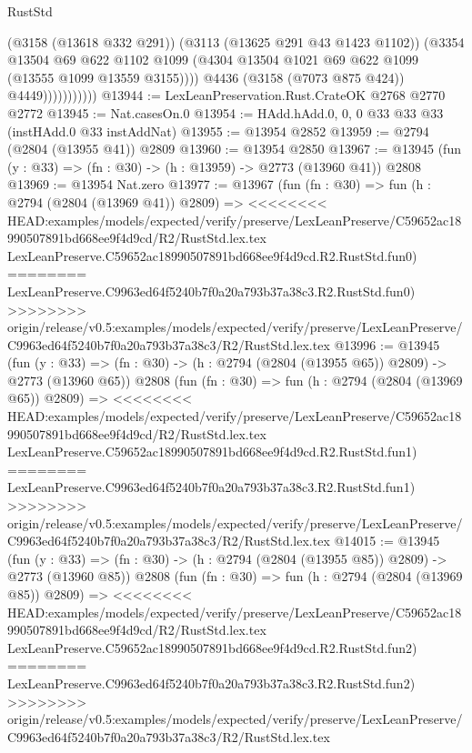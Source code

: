 \begin{lexlean}{RustStd}
\begin{coremodule}
{\begin{coremodule}
{{{{{{{{{{{{{{{{{{{{{{{{{{                            (@3158 (@13618 @332 @291))
                            (@3113 (@13625 @291 @43 @1423 @1102))
                            (@3354
                              @13504
                              @69
                              @622
                              @1102
                              @1099
                              (@4304 @13504 @1021 @69 @622 @1099 (@13555 @1099 @13559 @3155))))
                          @4436
                          (@3158 (@7073 @875 @424))
                          @4449)))))))))))
@13944 := LexLeanPreservation.Rust.CrateOK @2768 @2770 @2772
@13945 := Nat.casesOn.{0}
@13954 := HAdd.hAdd.{0, 0, 0} @33 @33 @33 (instHAdd.{0} @33 instAddNat)
@13955 := @13954 @2852
@13959 := @2794 (@2804 (@13955 @41)) @2809
@13960 := @13954 @2850
@13967 := @13945 (fun (y : @33) => (fn : @30) -> (h : @13959) -> @2773 (@13960 @41)) @2808
@13969 := @13954 Nat.zero
@13977 := @13967
    (fun (fn : @30) =>
    fun (h : @2794 (@2804 (@13969 @41)) @2809) =>
<<<<<<<< HEAD:examples/models/expected/verify/preserve/LexLeanPreserve/C59652ac18990507891bd668ee9f4d9cd/R2/RustStd.lex.tex
    LexLeanPreserve.C59652ac18990507891bd668ee9f4d9cd.R2.RustStd.fun0)
========
    LexLeanPreserve.C9963ed64f5240b7f0a20a793b37a38c3.R2.RustStd.fun0)
>>>>>>>> origin/release/v0.5:examples/models/expected/verify/preserve/LexLeanPreserve/C9963ed64f5240b7f0a20a793b37a38c3/R2/RustStd.lex.tex
@13996 := @13945
    (fun (y : @33) => (fn : @30) -> (h : @2794 (@2804 (@13955 @65)) @2809) -> @2773 (@13960 @65))
    @2808
    (fun (fn : @30) =>
    fun (h : @2794 (@2804 (@13969 @65)) @2809) =>
<<<<<<<< HEAD:examples/models/expected/verify/preserve/LexLeanPreserve/C59652ac18990507891bd668ee9f4d9cd/R2/RustStd.lex.tex
    LexLeanPreserve.C59652ac18990507891bd668ee9f4d9cd.R2.RustStd.fun1)
========
    LexLeanPreserve.C9963ed64f5240b7f0a20a793b37a38c3.R2.RustStd.fun1)
>>>>>>>> origin/release/v0.5:examples/models/expected/verify/preserve/LexLeanPreserve/C9963ed64f5240b7f0a20a793b37a38c3/R2/RustStd.lex.tex
@14015 := @13945
    (fun (y : @33) => (fn : @30) -> (h : @2794 (@2804 (@13955 @85)) @2809) -> @2773 (@13960 @85))
    @2808
    (fun (fn : @30) =>
    fun (h : @2794 (@2804 (@13969 @85)) @2809) =>
<<<<<<<< HEAD:examples/models/expected/verify/preserve/LexLeanPreserve/C59652ac18990507891bd668ee9f4d9cd/R2/RustStd.lex.tex
    LexLeanPreserve.C59652ac18990507891bd668ee9f4d9cd.R2.RustStd.fun2)
========
    LexLeanPreserve.C9963ed64f5240b7f0a20a793b37a38c3.R2.RustStd.fun2)
>>>>>>>> origin/release/v0.5:examples/models/expected/verify/preserve/LexLeanPreserve/C9963ed64f5240b7f0a20a793b37a38c3/R2/RustStd.lex.tex
}}}}}}}}}}}}}}}}}}}}}}}}}}
\end{coremodule}}
\end{coremodule}
\end{lexlean}
